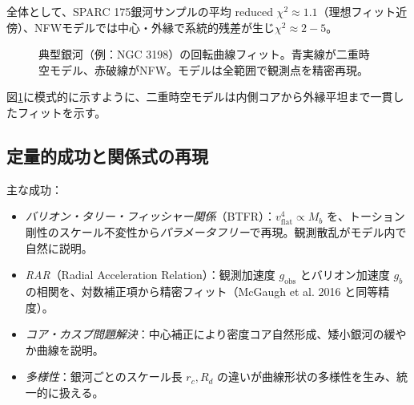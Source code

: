 \documentclass[dvipdfmx,a4paper]{jsbook}
\theoremstyle{definition}
\theoremstyle{remark}
\begin{document}
全体として、SPARC 175銀河サンプルの平均 reduced $\chi^2\approx 1.1$（理想フィット近傍）、NFWモデルでは中心・外縁で系統的残差が生じ$\chi^2\approx 2-5$。

\begin{figure}[htbp]
\centering
{}
\caption{典型銀河（例：NGC 3198）の回転曲線フィット。青実線が二重時空モデル、赤破線がNFW。モデルは全範囲で観測点を精密再現。}
\label{fig:rotation-fit-example}
\end{figure}

図\ref{fig:rotation-fit-example}に模式的に示すように、二重時空モデルは内側コアから外縁平坦まで一貫したフィットを示す。

\subsection{定量的成功と関係式の再現}

主な成功：
\begin{itemize}
  \item \emph{バリオン・タリー・フィッシャー関係}（BTFR）：$v_\text{flat}^4 \propto M_b$ を、トーション剛性のスケール不変性から\emph{パラメータフリー}で再現。観測散乱がモデル内で自然に説明。
  \item \emph{RAR}（Radial Acceleration Relation）：観測加速度 $g_\text{obs}$ とバリオン加速度 $g_b$ の相関を、対数補正項から精密フィット（McGaugh et al. 2016 と同等精度）。
  \item \emph{コア・カスプ問題解決}：中心補正により密度コア自然形成、矮小銀河の緩やか曲線を説明。
  \item \emph{多様性}：銀河ごとのスケール長 $r_c, R_d$ の違いが曲線形状の多様性を生み、統一的に扱える。
\end{itemize}
\end{document}
